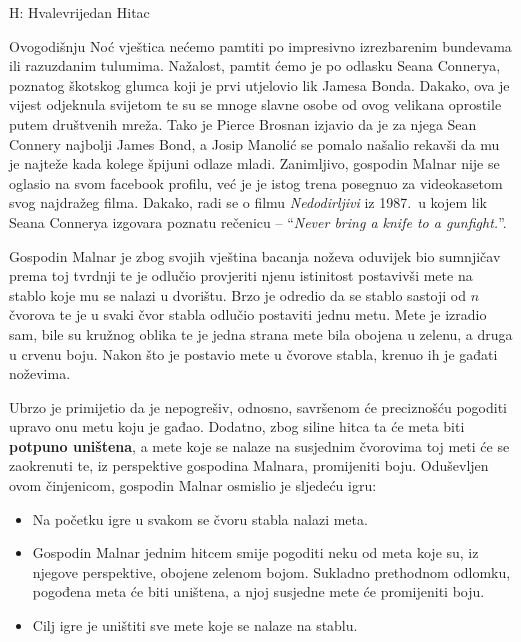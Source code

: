 \begin{statement}[
  timelimit=1 s,
  memorylimit=512 MiB,
]{H: Hvalevrijedan Hitac}

Ovogodišnju Noć vještica nećemo pamtiti po impresivno izrezbarenim bundevama
ili razuzdanim tulumima. Nažalost, pamtit ćemo je po odlasku Seana Connerya,
poznatog škotskog glumca koji je prvi utjelovio lik Jamesa Bonda.  Dakako,
ova je vijest odjeknula svijetom te su se mnoge slavne osobe od ovog velikana
oprostile putem društvenih mreža. Tako je Pierce Brosnan izjavio da je za
njega Sean Connery najbolji James Bond, a Josip Manolić se pomalo našalio
rekavši da mu je najteže kada kolege špijuni odlaze mladi.  Zanimljivo,
gospodin Malnar nije se oglasio na svom facebook profilu, već je je istog
trena posegnuo za videokasetom svog najdražeg filma. Dakako, radi se o filmu
\textit{Nedodirljivi} iz 1987.\ u kojem lik Seana Connerya izgovara poznatu
rečenicu -- ``\textit{Never bring a knife to a gunfight.}''.

Gospodin Malnar je zbog svojih vještina bacanja noževa oduvijek bio sumnjičav
prema toj tvrdnji te je odlučio provjeriti njenu istinitost postavivši
mete na stablo koje mu se nalazi u dvorištu. Brzo je odredio da se stablo
sastoji od $n$ čvorova te je u svaki čvor stabla odlučio postaviti jednu
metu. Mete je izradio sam, bile su kružnog oblika te je jedna strana mete bila
obojena u zelenu, a druga u crvenu boju. Nakon što je postavio mete u čvorove
stabla, krenuo ih je gađati noževima.

Ubrzo je primijetio da je nepogrešiv, odnosno, savršenom će preciznošću
pogoditi upravo onu metu koju je gađao. Dodatno, zbog siline hitca ta će meta
biti \textbf{potpuno uništena}, a mete koje se nalaze na susjednim čvorovima
toj meti će se zaokrenuti te, iz perspektive gospodina Malnara, promijeniti
boju. Oduševljen ovom činjenicom, gospodin Malnar osmislio je sljedeću igru:

\begin{itemize}
    \item Na početku igre u svakom se čvoru stabla nalazi meta.
    \item Gospodin Malnar jednim hitcem smije pogoditi neku od meta koje su,
          iz njegove perspektive, obojene zelenom bojom. Sukladno prethodnom
          odlomku, pogođena meta će biti uništena, a njoj susjedne mete će
          promijeniti boju.
    \item Cilj igre je uništiti sve mete koje se nalaze na stablu.
\end{itemize}


\end{statement}
